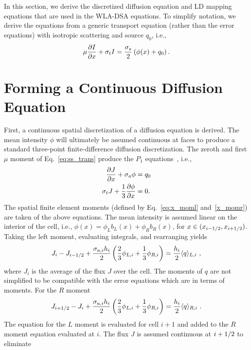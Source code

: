 In this section, we derive the discretized diffusion equation and LD mapping equations
that are used in the WLA-DSA equations.  To simplify notation, we
derive the equations from a generic transport equation (rather than the error equations) with isotropic scattering
and source $q_0$, i.e.,
\begin{equation}\label{eq:ss_trans}
    \mu \frac{\partial I}{\partial x} + \sigma_t I = \frac{\sigma_s}{2}\left( \phi(x) + q_0\right).
\end{equation}

\section{Forming a Continuous Diffusion Equation}

First, a continuous spatial discretization of a diffusion equation is derived.  
The mean intensity $\phi$ will ultimately be assumed continuous at faces to produce a
standard three-point finite-difference diffusion discretization. 
The zeroth and first $\mu$ moment of Eq.~\eqref{eq:ss_trans} produce the $P_1$
equations~\cite{lewis,wla_thesis}, i.e., 
\begin{align}\label{eq:dsa_bal}
    \frac{\partial J}{\partial x} + \sigma_a \phi &= q_0 \\ \label{eq:p1}
    \sigma_t J + \frac{1}{3} \frac{\partial \phi}{\partial x} &= 0.
\end{align}
The spatial finite element moments (defined by Eq.~\eqref{eq:x_moml} and~\eqref{x_momr})
are taken of the above equations. 
The mean intensity is assumed linear on the interior of the cell, i.e.,
$\phi(x)=\phi_Lb_L(x) + \phi_Rb_R(x)$, for $x\in({x_{i-1/2}},{x_{i+1/2}})$.   Taking the left moment,
evaluating integrals, and rearranging yields
\begin{equation}
    J_{i} - J_{{i-1/2}}  + \frac{\sigma_{a,i}h_i}{2} \left(\frac{2}{3} \phi_{L,i} + \frac{1}{3}
    \phi_{R,i} \right) = \frac{h_i}{2} \langle q \rangle_{L,i}\,\,,
\end{equation}
where $J_i$ is the average of the flux $J$ over the cell. The moments of $q$ are
not simplified to be compatible with the error equations which are in terms of moments. For the $R$ moment
\begin{equation}
    J_{i+1/2} - J_{i}  + \frac{\sigma_{a,i}h_i}{2} \left(\frac{2}{3} \phi_{L,i} + \frac{1}{3}
    \phi_{R,i} \right) = \frac{h_i}{2} \langle q \rangle_{R,i}\,\,.
\end{equation}
The equation for the $L$ moment is evaluated for cell $i+1$ and added to the $R$ moment
equation evaluated at $i$.  The flux $J$ is assumed continuous at ${i+1/2}$ to eliminate
